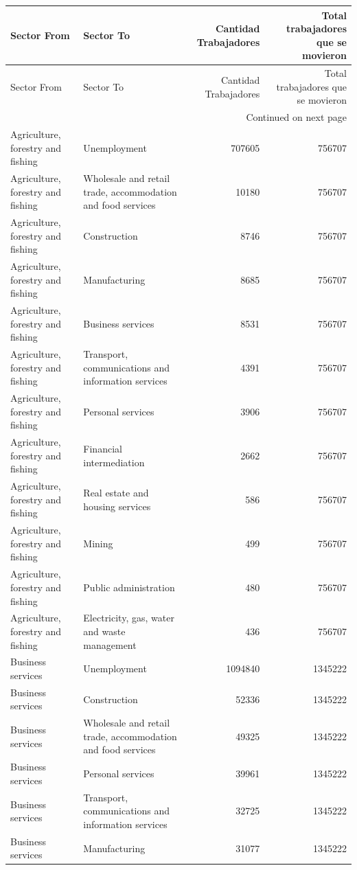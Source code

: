 \begin{longtable}{llrr}
\toprule
Sector From & Sector To & Cantidad Trabajadores & Total trabajadores que se movieron \\
\midrule
\endfirsthead
\toprule
Sector From & Sector To & Cantidad Trabajadores & Total trabajadores que se movieron \\
\midrule
\endhead
\midrule
\multicolumn{4}{r}{Continued on next page} \\
\midrule
\endfoot
\bottomrule
\endlastfoot
Agriculture, forestry and fishing & Unemployment & 707605 & 756707 \\
Agriculture, forestry and fishing & Wholesale and retail trade, accommodation and food services & 10180 & 756707 \\
Agriculture, forestry and fishing & Construction & 8746 & 756707 \\
Agriculture, forestry and fishing & Manufacturing & 8685 & 756707 \\
Agriculture, forestry and fishing & Business services & 8531 & 756707 \\
Agriculture, forestry and fishing & Transport, communications and information services & 4391 & 756707 \\
Agriculture, forestry and fishing & Personal services & 3906 & 756707 \\
Agriculture, forestry and fishing & Financial intermediation & 2662 & 756707 \\
Agriculture, forestry and fishing & Real estate and housing services & 586 & 756707 \\
Agriculture, forestry and fishing & Mining & 499 & 756707 \\
Agriculture, forestry and fishing & Public administration & 480 & 756707 \\
Agriculture, forestry and fishing & Electricity, gas, water and waste management & 436 & 756707 \\
Business services & Unemployment & 1094840 & 1345222 \\
Business services & Construction & 52336 & 1345222 \\
Business services & Wholesale and retail trade, accommodation and food services & 49325 & 1345222 \\
Business services & Personal services & 39961 & 1345222 \\
Business services & Transport, communications and information services & 32725 & 1345222 \\
Business services & Manufacturing & 31077 & 1345222 \\

\end{longtable}
